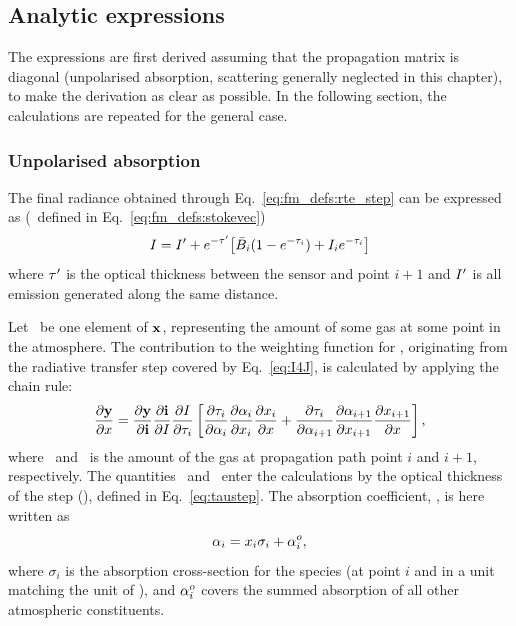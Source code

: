 \subsection{Analytic expressions}
%
The expressions are first derived assuming that the propagation matrix is
diagonal (unpolarised absorption, scattering generally neglected in this
chapter), to make the derivation as clear as possible. In the following
section, the calculations are repeated for the general case.

\subsubsection{Unpolarised absorption}
%
The final radiance obtained through Eq.~\ref{eq:fm_defs:rte_step} can be
expressed as (\StoI\ defined in Eq.~\ref{eq:fm_defs:stokevec})
\begin{equation}
  \label{eq:I4J}
  I = I'+ e^{-\tau'}\!\left[ \bar{B}_i(1-e^{-\tau_{i}}) + 
                                         I_{i}e^{-\tau_{i}} \right]
\end{equation}
where $\tau'$ is the optical thickness between the sensor and point $i+1$ and
$I'$ is all emission generated along the same distance.

Let \SttElm\ be one element of $\mathbf{x}$, representing the amount of
some gas at some point in the atmosphere. The contribution to the weighting
function for \SttElm, originating from the radiative transfer step covered by
Eq.~\ref{eq:I4J}, is calculated by applying the chain rule:
\begin{equation}
  \label{eq:chainrule1}
  \frac{\partial\mathbf{y}}{\partial x} =  
  \frac{\partial\mathbf{y}}{\partial\mathbf{i}}
  \frac{\partial\mathbf{i}}{\partial I} 
  \frac{\partial I}{\partial\tau_{i}}
  \left[ \frac{\partial\tau_{i}}{\partial{\alpha}_{i}}
         \frac{\partial{\alpha}_{i}}{\partial x_{i}} 
         \frac{\partial x_{i}}{\partial x} +
         \frac{\partial\tau_{i}}{\partial{\alpha}_{i+1}}
         \frac{\partial{\alpha}_{i+1}}{\partial x_{i+1}}
         \frac{\partial x_{i+1}}{\partial x} 
  \right],
\end{equation}
where \ and \ is the amount of the gas at propagation
path point $i$ and $i+1$, respectively. The quantities \ and
\ enter the calculations by the optical thickness of the step
(), defined in Eq.~\ref{eq:taustep}. The absorption coefficient,
, is here written as
\begin{equation}
  \label{eq:wfuns:crossec1}
  {\alpha}_{i} = x_{i}\sigma_i + {\alpha}_{i}^o,
\end{equation}
where $\sigma_i$ is the absorption cross-section for the species (at point $i$
and in a unit matching the unit of \SttElm), and ${\alpha}_{i}^o$ covers the
summed absorption of all other atmospheric constituents.

